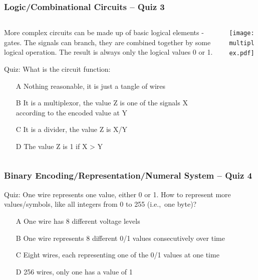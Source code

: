 \documentclass{beamer}
\begin{document}
\begin{frame}
\frametitle{Logic/Combinational Circuits -- Quiz 3}

\begin{columns}
\begin{column}{0.55\textwidth}

More complex circuits can be made up of basic logical elements - gates. The signals can branch, they are combined together by some logical operation. The result is always only the logical values 0 or 1.

\bigskip

Quiz: What is the circuit function:
\begin{itemize}
\item[A] Nothing reasonable, it is just a tangle of wires
\item[B] It is a multiplexor, the value Z is one of the signals X according to the encoded value at Y
\item[C] It is a divider, the value Z is X/Y
\item[D] The value Z is 1 if X > Y
\end{itemize}
\end{column}
\begin{column}{0.45\textwidth}
\begin{center}
   \texttt{[image: multiplex.pdf]}
\end{center}
\end{column}
\end{columns}


\end{frame}


\begin{frame}
\frametitle{Binary Encoding/Representation/Numeral System -- Quiz 4}

Quiz: One wire represents one value, either 0 or 1. How to represent more values/symbols, like all integers from 0 to 255 (i.e.,\ one byte)?
\begin{itemize}
\item[A] One wire has 8 different voltage levels
\item[B] One wire represents 8 different 0/1 values consecutively over time
\item[C] Eight wires, each representing one of the 0/1 values at one time
\item[D] 256 wires, only one has a value of 1
\end{itemize}

\end{frame}
\end{document}

